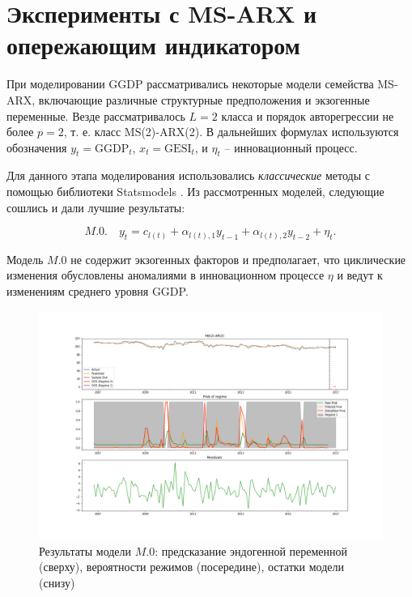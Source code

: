 \documentclass[a4paper,14pt]{extreport}
\begin{document}
\section{Эксперименты с MS-ARX и опережающим индикатором}

При моделировании GGDP рассматривались некоторые модели семейства MS-ARX, включающие различные структурные предположения и экзогенные переменные. Везде рассматривалось $L=2$ класса и порядок авторегрессии не более $p=2$, т. е. класс MS(2)-ARX(2). В дальнейших формулах используются обозначения $y_t = \text{GGDP}_t$, $x_t = \text{GESI}_t$, и $\eta_t$ -- инновационный процесс.

Для данного этапа моделирования использовались \textit{классические} методы с помощью библиотеки Statsmodels \cite{statsmodels}. Из рассмотренных моделей, следующие сошлись и дали лучшие результаты:

\begin{equation}
	M.0. \quad y_t = c_{l(t)} + \alpha_{l(t), 1} y_{t-1} + \alpha_{l(t), 2} y_{t-2} + \eta_t .
\end{equation}

Модель $M.0$ не содержит экзогенных факторов и предполагает, что циклические изменения обусловлены аномалиями в инновационном процессе $\eta$ и ведут к изменениям среднего уровня GGDP.

\begin{figure}[H]
	\includegraphics[width=\linewidth]{img/manual/model_m0.png}
	\caption{Результаты модели $M.0$: предсказание эндогенной переменной (сверху), вероятности режимов (посередине), остатки модели (снизу)}
	\label{fig:sm_model_m0}
\end{figure}
\end{document}
